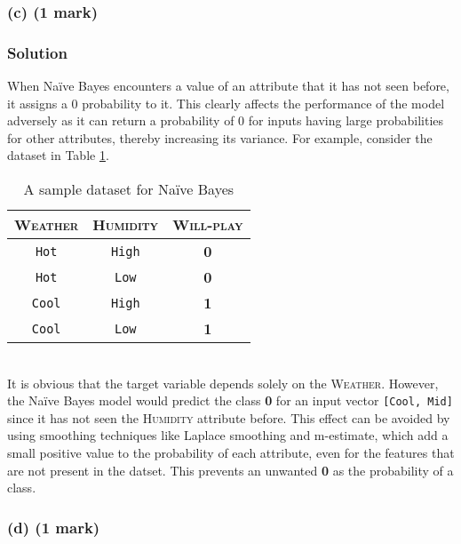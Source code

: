 \documentclass[12pt]{article}
\begin{document}
    \subsubsection*{(c) (1 mark)}
    \subsubsection*{Solution}
    When Naïve Bayes encounters a value of an attribute that it has not seen before,
    it assigns a 0 probability to it. This clearly affects the performance of the
    model adversely as it can return a probability of 0 for inputs having large
    probabilities for other attributes, thereby increasing its variance. For
    example, consider the dataset in Table \ref{tab:dataset}.
    \begin{table}[htbp]
        \centering
        \begin{tabular}{cc|c}
            \textsc{Weather} & \textsc{Humidity} & \textsc{Will-play} \\
            \hline
            \texttt{Hot} & \texttt{High} & \textbf{0} \\
            \texttt{Hot} & \texttt{Low} & \textbf{0} \\
            \texttt{Cool} & \texttt{High} & \textbf{1} \\
            \texttt{Cool} & \texttt{Low} & \textbf{1}
        \end{tabular}
        \caption{A sample dataset for Naïve Bayes}
        \label{tab:dataset}
    \end{table}
    \vspace*{0pt} \\
    It is obvious that the target variable depends solely on the \textsc{Weather}.
    However, the Naïve Bayes model would predict the class \textbf{0} for an
    input vector \texttt{[Cool, Mid]} since it has not seen the \textsc{Humidity}
    attribute before.
    This effect can be avoided by using smoothing techniques like Laplace smoothing
    and m-estimate, which add a small positive value to the probability of each
    attribute, even for the features that are not present in the datset. This
    prevents an unwanted \textbf{0} as the probability of a class.

    \subsubsection*{(d) (1 mark)}
\end{document}
